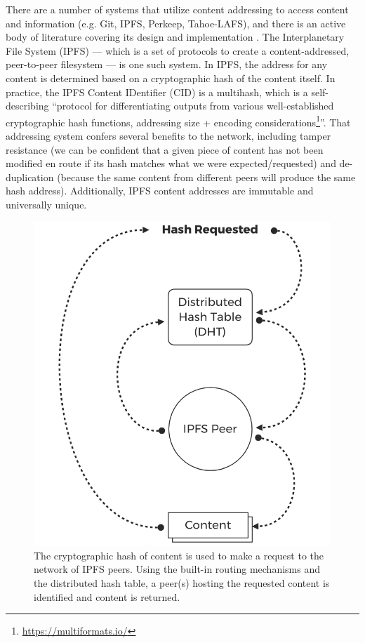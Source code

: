 \documentclass{textile}
\begin{document}
There are a number of systems that utilize content addressing to access content and information (e.g. Git, IPFS, Perkeep, Tahoe-LAFS), and there is an active body of literature covering its design and implementation \cite{benetIPFSContentAddressed2014,selimi_tahoeLafs_2014,rhea_fast_2008}. The Interplanetary File System (IPFS) --- which is a set of protocols to create a content-addressed, peer-to-peer filesystem \cite{benetIPFSContentAddressed2014} --- is one such system. In IPFS, the address for any content is determined based on a cryptographic hash of the content itself. In practice, the IPFS Content IDentifier (CID) is a multihash, which is a self-describing ``protocol for differentiating outputs from various well-established cryptographic hash functions, addressing size + encoding considerations\footnote{\url{https://multiformats.io/}}''. That addressing system confers several benefits to the network, including tamper resistance (we can be confident that a given piece of content has not been modified en route if its hash matches what we were expected/requested) and de-duplication (because the same content from different peers will produce the same hash address). Additionally, IPFS content addresses are immutable and universally unique.

\begin{figure}
  \includegraphics[width=\linewidth]{figures/Hash_Request.png}
  \caption{The cryptographic hash of content is used to make a request to the network of IPFS peers. Using the built-in routing mechanisms and the distributed hash table, a peer(s) hosting the requested content is identified and content is returned. }
  \label{fig:contentaddressing}
\end{figure}
\end{document}
